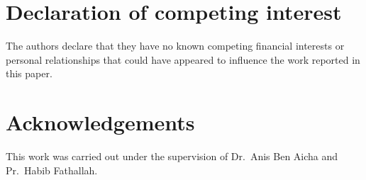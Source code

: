 \documentclass[preprint,12pt]{elsarticle}
\begin{document}
\section*{Declaration of competing interest}
The authors declare that they have no known competing financial interests or personal relationships that could have appeared to influence the work reported in this paper.

\section*{Acknowledgements}
This work was carried out under the supervision of Dr.\ Anis Ben Aicha and Pr.\ Habib Fathallah.



\end{document}

